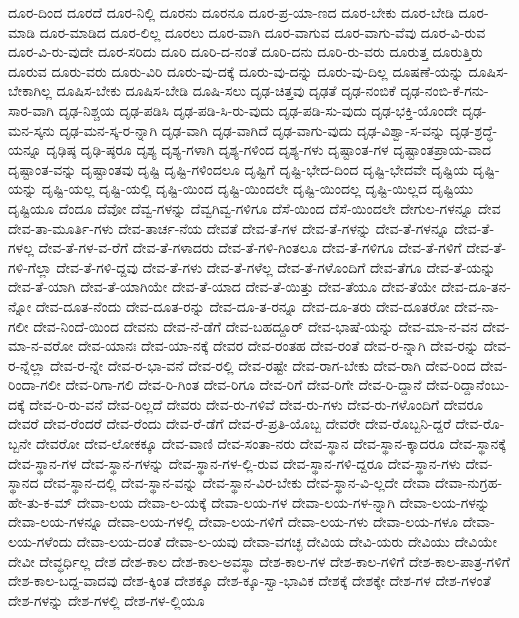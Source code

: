 {ದೂರ-ದಿಂದ
ದೂರದೆ
ದೂರ-ನಿಲ್ಲಿ
ದೂರನು
ದೂರನೂ
ದೂರ-ಪ್ರ-ಯಾ-ಣದ
ದೂರ-ಬೇಕು
ದೂರ-ಬೇಡಿ
ದೂರ-ಮಾಡಿ
ದೂರ-ಮಾಡಿದ
ದೂರ-ಲಿಲ್ಲ
ದೂರಲು
ದೂರ-ವಾಗಿ
ದೂರ-ವಾಗುವ
ದೂರ-ವಾಗು-ವೆವು
ದೂರ-ವಿ-ರುವ
ದೂರ-ವಿ-ರು-ವುದೇ
ದೂರ-ಸರಿದು
ದೂರಿ
ದೂರಿ-ದ-ನಂತೆ
ದೂರಿ-ದನು
ದೂರಿ-ರು-ವರು
ದೂರುತ್ತ
ದೂರುತ್ತಿರು
ದೂರುವ
ದೂರು-ವರು
ದೂರು-ವಿರಿ
ದೂರು-ವು-ದಕ್ಕೆ
ದೂರು-ವು-ದನ್ನು
ದೂರು-ವು-ದಿಲ್ಲ
ದೂಷಣೆ-ಯನ್ನು
ದೂಷಿಸ-ಬೇಕಾಗಿಲ್ಲ
ದೂಷಿಸ-ಬೇಕು
ದೂಷಿಸ-ಬೇಡಿ
ದೂಷಿ-ಸಲು
ದೃಢ-ಚಿತ್ತವು
ದೃಢತೆ
ದೃಢ-ನಂಬಿಕೆ
ದೃಢ-ನಂಬಿ-ಕೆ-ಗನು-ಸಾರ-ವಾಗಿ
ದೃಢ-ನಿಶ್ಚಯ
ದೃಢ-ಪಡಿಸಿ
ದೃಢ-ಪಡಿ-ಸಿ-ರು-ವುದು
ದೃಢ-ಪಡಿ-ಸು-ವುದು
ದೃಢ-ಭಕ್ತಿ-ಯೊಂದೇ
ದೃಢ-ಮನ-ಸ್ಕನು
ದೃಢ-ಮನ-ಸ್ಕ-ರ-ನ್ನಾಗಿ
ದೃಢ-ವಾಗಿ
ದೃಢ-ವಾಗಿದೆ
ದೃಢ-ವಾಗು-ವುದು
ದೃಢ-ವಿಶ್ವಾ-ಸ-ವನ್ನು
ದೃಢ-ಶ್ರದ್ಧೆ-ಯನ್ನೂ
ದೃಢಿಷ್ಠ
ದೃಢಿ-ಷ್ಠರೂ
ದೃಶ್ಯ
ದೃಶ್ಯ-ಗಳಾಗಿ
ದೃಶ್ಯ-ಗಳಿಂದ
ದೃಶ್ಯ-ಗಳು
ದೃಷ್ಟಾಂತ-ಗಳ
ದೃಷ್ಟಾಂತಪ್ರಾಯ-ವಾದ
ದೃಷ್ಟಾಂತ-ವನ್ನು
ದೃಷ್ಟಾಂತವು
ದೃಷ್ಟಿ
ದೃಷ್ಟಿ-ಗಳಿಂದಲೂ
ದೃಷ್ಟಿಗೆ
ದೃಷ್ಟಿ-ಭೇದ-ದಿಂದ
ದೃಷ್ಟಿ-ಭೇದವೇ
ದೃಷ್ಟಿಯ
ದೃಷ್ಟಿ-ಯನ್ನು
ದೃಷ್ಟಿ-ಯಲ್ಲ
ದೃಷ್ಟಿ-ಯಲ್ಲಿ
ದೃಷ್ಟಿ-ಯಿಂದ
ದೃಷ್ಟಿ-ಯಿಂದಲೇ
ದೃಷ್ಟಿ-ಯಿಂದಲ್ಲ
ದೃಷ್ಟಿ-ಯಿಲ್ಲದ
ದೃಷ್ಟಿಯು
ದೃಷ್ಟಿಯೂ
ದೆಂದೂ
ದೆವೋ
ದೆವ್ವ-ಗಳನ್ನು
ದೆವ್ವಗಿವ್ವ-ಗಳಿಗೂ
ದೆಸೆ-ಯಿಂದ
ದೆಸೆ-ಯಿಂದಲೇ
ದೇಗುಲ-ಗಳನ್ನೂ
ದೇವ
ದೇವ-ತಾ-ಮೂರ್ತಿ-ಗಳು
ದೇವ-ತಾರ್ಚ-ನೆಯ
ದೇವತೆ
ದೇವ-ತೆ-ಗಳ
ದೇವ-ತೆ-ಗಳನ್ನು
ದೇವ-ತೆ-ಗಳನ್ನೂ
ದೇವ-ತೆ-ಗಳಲ್ಲ
ದೇವ-ತೆ-ಗಳ-ವ-ರೆಗೆ
ದೇವ-ತೆ-ಗಳಾದರು
ದೇವ-ತೆ-ಗಳಿ-ಗಿಂತಲೂ
ದೇವ-ತೆ-ಗಳಿಗೂ
ದೇವ-ತೆ-ಗಳಿಗೆ
ದೇವ-ತೆ-ಗಳಿ-ಗೆಲ್ಲಾ
ದೇವ-ತೆ-ಗಳಿ-ದ್ದವು
ದೇವ-ತೆ-ಗಳು
ದೇವ-ತೆ-ಗಳೆಲ್ಲ
ದೇವ-ತೆ-ಗಳೊಂದಿಗೆ
ದೇವ-ತೆಗೂ
ದೇವ-ತೆ-ಯನ್ನು
ದೇವ-ತೆ-ಯಾಗಿ
ದೇವ-ತೆ-ಯಾಗಿಯೇ
ದೇವ-ತೆ-ಯಾದ
ದೇವ-ತೆ-ಯಿತ್ತು
ದೇವ-ತೆಯೂ
ದೇವ-ತೆಯೇ
ದೇವ-ದೂ-ತನ-ನ್ನೋ
ದೇವ-ದೂತ-ನೆಂದು
ದೇವ-ದೂತ-ರನ್ನು
ದೇವ-ದೂ-ತ-ರನ್ನೂ
ದೇವ-ದೂ-ತರು
ದೇವ-ದೂತರೋ
ದೇವ-ನಾ-ಗಲೀ
ದೇವ-ನಿಂದೆ-ಯಿಂದ
ದೇವನು
ದೇವ-ನೆ-ಡೆಗೆ
ದೇವ-ಬಹದ್ದೂರ್
ದೇವ-ಭಾಷೆ-ಯನ್ನು
ದೇವ-ಮಾ-ನ-ವನ
ದೇವ-ಮಾ-ನ-ವರೋ
ದೇವ-ಯಾನಃ
ದೇವ-ಯಾ-ನಕ್ಕೆ
ದೇವರ
ದೇವ-ರಂತಹ
ದೇವ-ರಂತೆ
ದೇವ-ರ-ನ್ನಾಗಿ
ದೇವ-ರನ್ನು
ದೇವ-ರ-ನ್ನೆಲ್ಲಾ
ದೇವ-ರ-ನ್ನೇ
ದೇವ-ರ-ಭಾ-ವನೆ
ದೇವ-ರಲ್ಲಿ
ದೇವ-ರಷ್ಟೇ
ದೇವ-ರಾಗ-ಬೇಕು
ದೇವ-ರಾಗಿ
ದೇವ-ರಿಂದ
ದೇವ-ರಿಂದಾ-ಗಲೀ
ದೇವ-ರಿಗಾ-ಗಲಿ
ದೇವ-ರಿ-ಗಿಂತ
ದೇವ-ರಿಗೂ
ದೇವ-ರಿಗೆ
ದೇವ-ರಿಗೇ
ದೇವ-ರಿ-ದ್ದಾನೆ
ದೇವ-ರಿದ್ದಾನೆಂಬು-ದಕ್ಕೆ
ದೇವ-ರಿ-ರು-ವನೆ
ದೇವ-ರಿಲ್ಲದೆ
ದೇವರು
ದೇವ-ರು-ಗಳಿವೆ
ದೇವ-ರು-ಗಳು
ದೇವ-ರು-ಗಳೊಂದಿಗೆ
ದೇವರೂ
ದೇವರೆ
ದೇವ-ರೆಂದರೆ
ದೇವ-ರೆಂದು
ದೇವ-ರೆ-ಡೆಗೆ
ದೇವ-ರೆ-ಪ್ರತಿ-ಯೊಬ್ಬ
ದೇವರೇ
ದೇವ-ರೊಬ್ಬನಿ-ದ್ದರೆ
ದೇವ-ರೊ-ಬ್ಬನೇ
ದೇವರೋ
ದೇವ-ಲೋಕಕ್ಕೂ
ದೇವ-ವಾಣಿ
ದೇವ-ಸಂತಾ-ನರು
ದೇವ-ಸ್ಥಾನ
ದೇವ-ಸ್ಥಾನ-ಕ್ಕಾದರೂ
ದೇವ-ಸ್ಥಾನಕ್ಕೆ
ದೇವ-ಸ್ಥಾನ-ಗಳ
ದೇವ-ಸ್ಥಾನ-ಗಳನ್ನು
ದೇವ-ಸ್ಥಾನ-ಗಳ-ಲ್ಲಿ-ರುವ
ದೇವ-ಸ್ಥಾನ-ಗಳಿ-ದ್ದರೂ
ದೇವ-ಸ್ಥಾನ-ಗಳು
ದೇವ-ಸ್ಥಾನದ
ದೇವ-ಸ್ಥಾನ-ದಲ್ಲಿ
ದೇವ-ಸ್ಥಾನ-ವನ್ನು
ದೇವ-ಸ್ಥಾನ-ವಿರ-ಬೇಕು
ದೇವ-ಸ್ಥಾನ-ವಿ-ಲ್ಲದೇ
ದೇವಾ
ದೇವಾ-ನುಗ್ರಹ-ಹೇ-ತು-ಕ-ಮ್
ದೇವಾ-ಲಯ
ದೇವಾ-ಲ-ಯಕ್ಕೆ
ದೇವಾ-ಲಯ-ಗಳ
ದೇವಾ-ಲಯ-ಗಳ-ನ್ನಾಗಿ
ದೇವಾ-ಲಯ-ಗಳನ್ನು
ದೇವಾ-ಲಯ-ಗಳನ್ನೂ
ದೇವಾ-ಲಯ-ಗಳಲ್ಲಿ
ದೇವಾ-ಲಯ-ಗಳಿಗೆ
ದೇವಾ-ಲಯ-ಗಳು
ದೇವಾ-ಲಯ-ಗಳೂ
ದೇವಾ-ಲಯ-ಗಳೆಂದು
ದೇವಾ-ಲಯ-ದಂತೆ
ದೇವಾ-ಲ-ಯವು
ದೇವಾ-ವಗಚ್ಛ
ದೇವಿಯ
ದೇವಿ-ಯರು
ದೇವಿಯು
ದೇವಿಯೇ
ದೇವೀ
ದೇವ್ಧರ್ಧಿಲ್ಲ
ದೇಶ
ದೇಶ-ಕಾಲ
ದೇಶ-ಕಾಲ-ಅವಸ್ಥಾ
ದೇಶ-ಕಾಲ-ಗಳ
ದೇಶ-ಕಾಲ-ಗಳಿಗೆ
ದೇಶ-ಕಾಲ-ಪಾತ್ರ-ಗಳಿಗೆ
ದೇಶ-ಕಾಲ-ಬದ್ದ-ವಾದವು
ದೇಶ-ಕ್ಕಿಂತ
ದೇಶಕ್ಕೂ
ದೇಶ-ಕ್ಕೂ-ಸ್ವಾ-ಭಾವಿಕ
ದೇಶಕ್ಕೆ
ದೇಶಕ್ಕೇ
ದೇಶ-ಗಳ
ದೇಶ-ಗಳಂತೆ
ದೇಶ-ಗಳನ್ನು
ದೇಶ-ಗಳಲ್ಲಿ
ದೇಶ-ಗಳ-ಲ್ಲಿಯೂ
}
